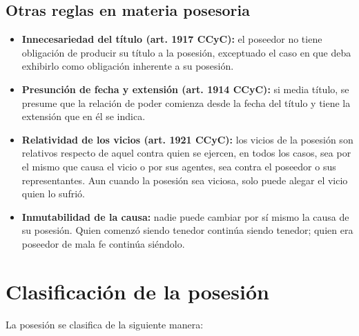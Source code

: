 \documentclass[12pt,oneside]{book}
\begin{document}
\subsection{Otras reglas en materia posesoria}

\begin{itemize}
    \item \textbf{Innecesariedad del título (art. 1917 CCyC):} el poseedor no tiene obligación de producir su título a la posesión, exceptuado el caso en que deba exhibirlo como obligación inherente a su posesión.
    \item \textbf{Presunción de fecha y extensión (art. 1914 CCyC):} si media título, se presume que la relación de poder comienza desde la fecha del título y tiene la extensión que en él se indica.
    \item \textbf{Relatividad de los vicios (art. 1921 CCyC):} los vicios de la posesión son relativos respecto de aquel contra quien se ejercen, en todos los casos, sea por el mismo que causa el vicio o por sus agentes, sea contra el poseedor o sus representantes. Aun cuando la posesión sea viciosa, solo puede alegar el vicio quien lo sufrió.
    \item \textbf{Inmutabilidad de la causa:} nadie puede cambiar por sí mismo la causa de su posesión. Quien comenzó siendo tenedor continúa siendo tenedor; quien era poseedor de mala fe continúa siéndolo.
\end{itemize}

\section{Clasificación de la posesión}

La posesión se clasifica de la siguiente manera:
\end{document}
